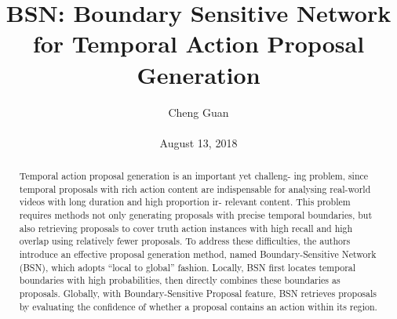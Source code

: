 \documentclass[10pt,twocolumn,letterpaper]{article}
\title{BSN: Boundary Sensitive Network for Temporal Action
	Proposal Generation}
\author{Cheng Guan\\\\
August 13, 2018}
\begin{document}
\maketitle
\begin{abstract}
Temporal action proposal generation is an important yet challeng-
ing problem, since temporal proposals with rich action content are indispensable 
for analysing real-world videos with long duration and high proportion ir-
relevant content. This problem requires methods not only generating proposals
with precise temporal boundaries, but also retrieving proposals to cover truth
action instances with high recall and high overlap using relatively fewer proposals.
To address these difficulties, the authors introduce an effective proposal generation method, 
named Boundary-Sensitive Network (BSN), which adopts “local to
global” fashion. Locally, BSN first locates temporal boundaries with high probabilities,
 then directly combines these boundaries as proposals. Globally, with
Boundary-Sensitive Proposal feature, BSN retrieves proposals by evaluating the
confidence of whether a proposal contains an action within its region.
\end{abstract}
\end{document}
